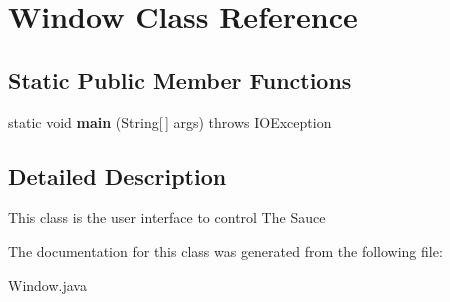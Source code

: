 \hypertarget{class_window}{}\section{Window Class Reference}
\label{class_window}
\subsection*{Static Public Member Functions}
\begin{DoxyCompactItemize}
\item 
\mbox{\label{class_window_a2936348a2e7d763e3be09f3b56d609a2}} 
static void {\bfseries main} (String\mbox{[}$\,$\mbox{]} args)  throws I\+O\+Exception 
\end{DoxyCompactItemize}


\subsection{Detailed Description}
This class is the user interface to control The Sauce 

The documentation for this class was generated from the following file\+:\begin{DoxyCompactItemize}
\item 
Window.\+java\end{DoxyCompactItemize}
